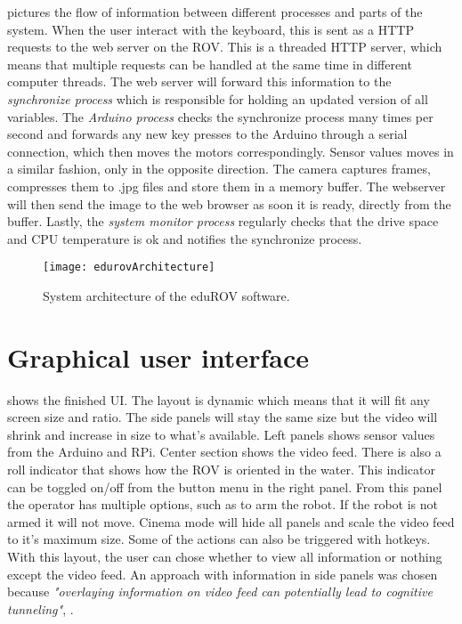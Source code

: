  pictures the flow of information between different processes and parts of the system. When the user interact with the keyboard, this is sent as a HTTP requests to the web server on the ROV. This is a threaded HTTP server, which means that multiple requests can be handled at the same time in different computer threads. The web server will forward this information to the \textit{synchronize process} which is responsible for holding an updated version of all variables. The \textit{Arduino process} checks the synchronize process many times per second and forwards any new key presses to the Arduino through a serial connection, which then moves the motors correspondingly. Sensor values moves in a similar fashion, only in the opposite direction. The camera captures frames, compresses them to .jpg files and store them in a memory buffer. The webserver will then send the image to the web browser as soon it is ready, directly from the buffer. Lastly, the \textit{system monitor process} regularly checks that the drive space and CPU temperature is ok and notifies the synchronize process.


\begin{figure}[h!]
    \centering
    \texttt{[image: edurovArchitecture]}
    \caption{System architecture of the eduROV software.}
    \label{edurovArchitecture}
\end{figure}

\section{Graphical user interface}

 shows the finished UI. The layout is dynamic which means that it will fit any screen size and ratio. The side panels will stay the same size but the video will shrink and increase in size to what's available. Left panels shows sensor values from the Arduino and RPi. Center section shows the video feed. There is also a roll indicator that shows how the ROV is oriented in the water. This indicator can be toggled on/off from the button menu in the right panel. From this panel the operator has multiple options, such as to arm the robot. If the robot is not armed it will not move. Cinema mode will hide all panels and scale the video feed to it's maximum size. Some of the actions can also be triggered with hotkeys. With this layout, the user can chose whether to view all information or nothing except the video feed. An approach with information in side panels was chosen because \textit{"overlaying information on video feed can potentially lead to cognitive tunneling"}, \citep{Chen2007}.

